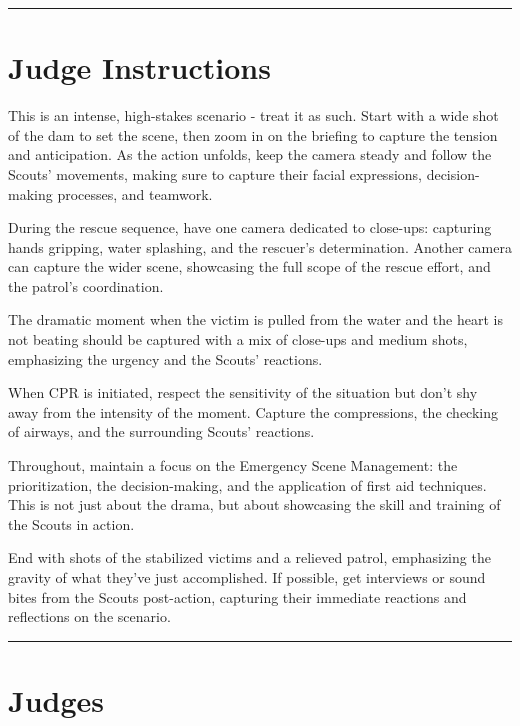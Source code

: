 \documentclass[10pt]{article}
\begin{document}
	\vspace{0.5cm}
	\hrule
	\vspace{0.5cm}

		\section*{Judge Instructions}
		This is an intense, high-stakes scenario - treat it as such. Start with a wide shot of the dam to set the scene, then zoom in on the briefing to capture the tension and anticipation. As the action unfolds, keep the camera steady and follow the Scouts' movements, making sure to capture their facial expressions, decision-making processes, and teamwork. 



During the rescue sequence, have one camera dedicated to close-ups: capturing hands gripping, water splashing, and the rescuer's determination. Another camera can capture the wider scene, showcasing the full scope of the rescue effort, and the patrol's coordination.



The dramatic moment when the victim is pulled from the water and the heart is not beating should be captured with a mix of close-ups and medium shots, emphasizing the urgency and the Scouts' reactions. 



When CPR is initiated, respect the sensitivity of the situation but don't shy away from the intensity of the moment. Capture the compressions, the checking of airways, and the surrounding Scouts' reactions.



Throughout, maintain a focus on the Emergency Scene Management: the prioritization, the decision-making, and the application of first aid techniques. This is not just about the drama, but about showcasing the skill and training of the Scouts in action.



End with shots of the stabilized victims and a relieved patrol, emphasizing the gravity of what they've just accomplished. If possible, get interviews or sound bites from the Scouts post-action, capturing their immediate reactions and reflections on the scenario.


\vspace{0.5cm}
	\hrule
	\vspace{0.5cm}
		\section*{\faUsers \: Judges}
\end{document}
